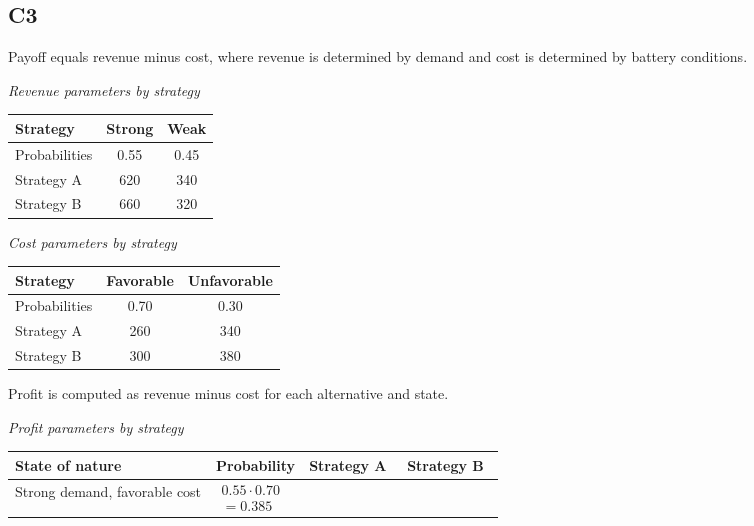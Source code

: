 \begin{ExamProblems}
		\subsection*{C3}
		Payoff equals revenue minus cost, where revenue is determined by demand and cost is determined by battery conditions.
		\begin{center}
			\begin{minipage}[t]{0.48\linewidth}
				\textit{Revenue parameters by strategy}
				\begin{center}
					\begin{tabular}{l c c}
						\toprule
						Strategy & Strong & Weak \\
						\midrule
						Probabilities & 0.55 & 0.45 \\
						Strategy A & 620 & 340 \\
						Strategy B & 660 & 320 \\
						\bottomrule
					\end{tabular}
				\end{center}
			\end{minipage}
			\hfill
			\begin{minipage}[t]{0.48\linewidth}
				\textit{Cost parameters by strategy}
				\begin{center}
					\begin{tabular}{l c c}
						\toprule
						Strategy & Favorable & Unfavorable \\
						\midrule
						Probabilities & 0.70 & 0.30 \\
						Strategy A & 260 & 340 \\
						Strategy B & 300 & 380 \\
						\bottomrule
					\end{tabular}
				\end{center}
			\end{minipage}
		\end{center}
		Profit is computed as revenue minus cost for each alternative and state.
		\begin{center}
			\textit{Profit parameters by strategy}
			\begin{tabular}{l p{0.17\linewidth} p{0.2\linewidth} p{0.2\linewidth}}
				\toprule
				State of nature & Probability & Strategy A & Strategy B \\
				\midrule
				Strong demand, favorable cost &
				$\begin{array}{l}
					0.55\cdot 0.70\\
					= 0.385
				\end{array}$ &

\end{tabular}
\end{center}
\end{ExamProblems}
